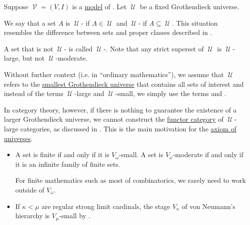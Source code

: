 \begin{definition}\label{def:large_and_small_sets}
  Suppose \( \mscrV = (V, I) \) is a \hyperref[def:first_order_semantics/satisfiability]{model} of . Let \( \mscrU \) be a fixed Grothendieck universe.

  We say that a set \( A \) is \( \mscrU \)- if \( A \in \mscrU \) and \( \mscrU \)- if \( A \subseteq \mscrU \). This situation resembles the difference between sets and proper classes described in .

  A set that is not \( \mscrU \)- is called \( \mscrU \)-. Note that any strict superset of \( \mscrU \) is \( \mscrU \)-large, but not \( \mscrU \)-moderate.

  Without further context (i.e. in \enquote{ordinary mathematics}), we assume that \( \mscrU \) refers to the \hyperref[thm:smallest_grothendieck_universe_existence]{smallest Grothendieck universe} that contains all sets of interest and instead of the terms \( \mscrU \)-large and \( \mscrU \)-small, we simply use the terms  and .

  In category theory, however, if there is nothing to guarantee the existence of a larger Grothendieck universe, we cannot construct the \hyperref[def:functor_category]{functor category} of \( \mscrU \)-large categories, as discussed in . This is the main motivation for the \hyperref[def:axiom_of_universes]{axiom of universes}.
\end{definition}

\begin{example}\label{ex:large_and_small_sets}
  \hfill
  \begin{itemize}
    \item A set is finite if and only if it is \( V_\omega \)-small. A set is \( V_\omega \)-moderate if and only if it is an infinite family of finite sets.

    For finite mathematics such as most of combinatorics, we rarely need to work outside of \( V_\omega \).

    \item If \( \kappa < \mu \) are regular strong limit cardinals, the stage \( V_\kappa \) of von Neumann's hierarchy is \( V_\mu \)-small by .
  \end{itemize}
\end{example}

